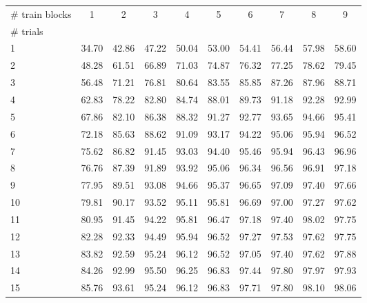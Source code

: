 \begin{tabularx}{\textwidth}{@{}Xccccccccc@{}}
\toprule
\# train blocks & 1 & 2 & 3 & 4 & 5 & 6 & 7 & 8 & 9 \\
\# trials &  &  &  &  &  &  &  &  &  \\
\midrule
1 & 34.70 & 42.86 & 47.22 & 50.04 & 53.00 & 54.41 & 56.44 & 57.98 & 58.60 \\
2 & 48.28 & 61.51 & 66.89 & 71.03 & 74.87 & 76.32 & 77.25 & 78.62 & 79.45 \\
3 & 56.48 & 71.21 & 76.81 & 80.64 & 83.55 & 85.85 & 87.26 & 87.96 & 88.71 \\
4 & 62.83 & 78.22 & 82.80 & 84.74 & 88.01 & 89.73 & 91.18 & 92.28 & 92.99 \\
5 & 67.86 & 82.10 & 86.38 & 88.32 & 91.27 & 92.77 & 93.65 & 94.66 & 95.41 \\
6 & 72.18 & 85.63 & 88.62 & 91.09 & 93.17 & 94.22 & 95.06 & 95.94 & 96.52 \\
7 & 75.62 & 86.82 & 91.45 & 93.03 & 94.40 & 95.46 & 95.94 & 96.43 & 96.96 \\
8 & 76.76 & 87.39 & 91.89 & 93.92 & 95.06 & 96.34 & 96.56 & 96.91 & 97.18 \\
9 & 77.95 & 89.51 & 93.08 & 94.66 & 95.37 & 96.65 & 97.09 & 97.40 & 97.66 \\
10 & 79.81 & 90.17 & 93.52 & 95.11 & 95.81 & 96.69 & 97.00 & 97.27 & 97.62 \\
11 & 80.95 & 91.45 & 94.22 & 95.81 & 96.47 & 97.18 & 97.40 & 98.02 & 97.75 \\
12 & 82.28 & 92.33 & 94.49 & 95.94 & 96.52 & 97.27 & 97.53 & 97.62 & 97.75 \\
13 & 83.82 & 92.59 & 95.24 & 96.12 & 96.52 & 97.05 & 97.40 & 97.62 & 97.88 \\
14 & 84.26 & 92.99 & 95.50 & 96.25 & 96.83 & 97.44 & 97.80 & 97.97 & 97.93 \\
15 & 85.76 & 93.61 & 95.24 & 96.12 & 96.83 & 97.71 & 97.80 & 98.10 & 98.06 \\
\bottomrule
\end{tabularx}

